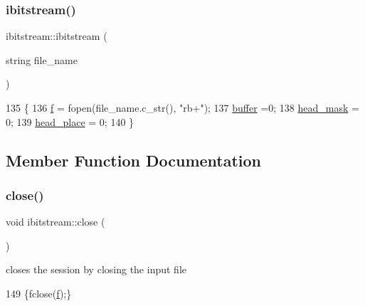\subsubsection{\texorpdfstring{ibitstream()}{ibitstream()}}
{\footnotesize\ttfamily ibitstream\+::ibitstream (\begin{DoxyParamCaption}\item[{string}]{file\+\_\+name }\end{DoxyParamCaption})\hspace{0.3cm}{\ttfamily [inline]}}


\begin{DoxyCode}
135                               \{
136     \hyperlink{classibitstream_a3ea2cdd0cf97820f0e1520c42e364308}{f} = fopen(file\_name.c\_str(), \textcolor{stringliteral}{"rb+"});
137     \hyperlink{classibitstream_a73f0b24d3d4402369f1abbb43f7f70ef}{buffer} =0;
138     \hyperlink{classibitstream_a48cd41991b6c29ea5120b53873a72a70}{head\_mask} = 0;
139     \hyperlink{classibitstream_a7b96359ac1534a5565e6e9b0cc53a0b3}{head\_place} = 0;
140   \}
\end{DoxyCode}


\subsection{Member Function Documentation}
\mbox{\label{classibitstream_aa7b59600e58571b802d6d0dadf92d37a}} 
\subsubsection{\texorpdfstring{close()}{close()}}
{\footnotesize\ttfamily void ibitstream\+::close (\begin{DoxyParamCaption}{ }\end{DoxyParamCaption})\hspace{0.3cm}{\ttfamily [inline]}}



closes the session by closing the input file 


\begin{DoxyCode}
149 \{fclose(\hyperlink{classibitstream_a3ea2cdd0cf97820f0e1520c42e364308}{f});\}
\end{DoxyCode}
\mbox{\label{classibitstream_ae3e91ecc9ff17eef98d72d44aec02eca}} 
